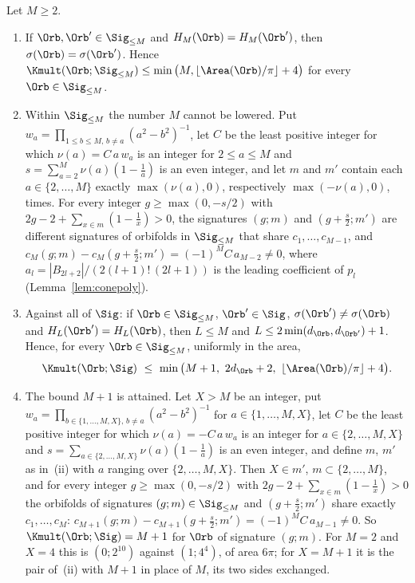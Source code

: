 \begin{theorem}\label{msep:thm}
Let $M\ge2$.
\begin{enumerate}[label=(\roman*)]
\item If $\Orb,\Orb'\in\Sig_{\le M}$ and $H_M(\Orb)=H_M(\Orb')$, then $\sigma(\Orb)=\sigma(\Orb')$. Hence $\Kmult(\Orb;\Sig_{\le M})\le\min\big(M,\lfloor\Area(\Orb)/\pi\rfloor+4\big)$ for every $\Orb\in\Sig_{\le M}$.
\item Within $\Sig_{\le M}$ the number $M$ cannot be lowered. Put $w_a=\prod_{1\le b\le M,\,b\ne a}(a^2-b^2)^{-1}$, let $C$ be the least positive integer for which $\nu(a)=C\,a\,w_a$ is an integer for $2\le a\le M$ and $s=\sum_{a=2}^M\nu(a)(1-\frac1a)$ is an even integer, and let $m$ and $m'$ contain each $a\in\{2,\dots,M\}$ exactly $\max(\nu(a),0)$, respectively $\max(-\nu(a),0)$, times. For every integer $g\ge\max(0,-s/2)$ with $2g-2+\sum_{x\in m}(1-\frac1x)>0$, the signatures $(g;m)$ and $(g+\frac s2;m')$ are different signatures of orbifolds in $\Sig_{\le M}$ that share $c_1,\dots,c_{M-1}$, and $c_M(g;m)-c_M(g+\frac s2;m')=(-1)^MC\,a_{M-2}\ne0$, where $a_l=|B_{2l+2}|/(2(l+1)!\,(2l+1))$ is the leading coefficient of $p_l$ (Lemma~\ref{lem:conepoly}).
\item Against all of $\Sig$: if $\Orb\in\Sig_{\le M}$, $\Orb'\in\Sig$, $\sigma(\Orb')\ne\sigma(\Orb)$ and $H_L(\Orb')=H_L(\Orb)$, then $L\le M$ and $L\le2\min(d_\Orb,d_{\Orb'})+1$. Hence, for every $\Orb\in\Sig_{\le M}$, uniformly in the area,
\[
  \Kmult(\Orb;\Sig)\ \le\ \min\big(M+1,\ 2d_\Orb+2,\ \lfloor\Area(\Orb)/\pi\rfloor+4\big).
\]
\item The bound $M+1$ is attained. Let $X>M$ be an integer, put $w_a=\prod_{b\in\{1,\dots,M,X\},\,b\ne a}(a^2-b^2)^{-1}$ for $a\in\{1,\dots,M,X\}$, let $C$ be the least positive integer for which $\nu(a)=-C\,a\,w_a$ is an integer for $a\in\{2,\dots,M,X\}$ and $s=\sum_{a\in\{2,\dots,M,X\}}\nu(a)(1-\frac1a)$ is an even integer, and define $m$, $m'$ as in~(ii) with $a$ ranging over $\{2,\dots,M,X\}$. Then $X\in m'$, $m\subset\{2,\dots,M\}$, and for every integer $g\ge\max(0,-s/2)$ with $2g-2+\sum_{x\in m}(1-\frac1x)>0$ the orbifolds of signatures $(g;m)\in\Sig_{\le M}$ and $(g+\frac s2;m')$ share exactly $c_1,\dots,c_M$: $c_{M+1}(g;m)-c_{M+1}(g+\frac s2;m')=(-1)^{M}C\,a_{M-1}\ne0$. So $\Kmult(\Orb;\Sig)=M+1$ for $\Orb$ of signature $(g;m)$. For $M=2$ and $X=4$ this is $(0;2^{10})$ against $(1;4^4)$, of area $6\pi$; for $X=M+1$ it is the pair of~(ii) with $M+1$ in place of $M$, its two sides exchanged.
\end{enumerate}
\end{theorem}

